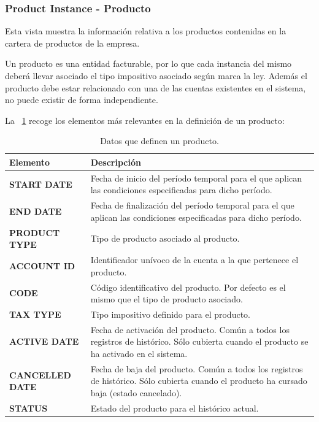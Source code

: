 \subsubsection{Product Instance - Producto}
\label{sub:product}

Esta vista muestra la información relativa a los productos contenidas en la cartera de productos de la empresa.

Un producto es una entidad facturable, por lo que cada instancia del mismo deberá llevar asociado el tipo impositivo asociado según marca la ley. Además el producto debe estar relacionado con una de las cuentas existentes en el sistema, no puede existir de forma independiente.


La \tablename~\ref{tab:producto} recoge los elementos más relevantes en la definición de un producto:

\begin{table}[H]
  \centering
  \setlength{\leftmargini}{0.4cm}
  \resizebox{14cm}{!} {
  \begin{tabular}{|m{6cm} m{8cm}|}
  \rowcolor{udcpink!25}
  \hline
  	\textbf{Elemento} & \textbf{Descripción} \\\hline
  	\textbf{START DATE} & Fecha de inicio del período temporal para el que aplican las condiciones especificadas para dicho período.\\
  	\textbf{END DATE} & Fecha de finalización del período temporal para el que aplican las condiciones especificadas para dicho período.\\
	\textbf{PRODUCT TYPE} & Tipo de producto asociado al producto.\\
	\textbf{ACCOUNT ID} & Identificador unívoco de la cuenta a la que pertenece el producto.\\
	\textbf{CODE} & Código identificativo del producto. Por defecto es el mismo que el tipo de producto asociado.\\	
	\textbf{TAX TYPE} & Tipo impositivo definido para el producto.\\
	\textbf{ACTIVE DATE} & Fecha de activación del producto. Común a todos los registros de histórico. Sólo cubierta cuando el producto se ha activado en el sistema.\\	
	\textbf{CANCELLED DATE} & Fecha de baja del producto. Común a todos los registros de histórico. Sólo cubierta cuando el producto ha cursado baja (estado cancelado).	\\
	\textbf{STATUS} & Estado del producto para el histórico actual.	
	\\\hline
  \end{tabular}
  } %
  \caption{Datos que definen un producto.}
  \label{tab:producto}
\end{table}



